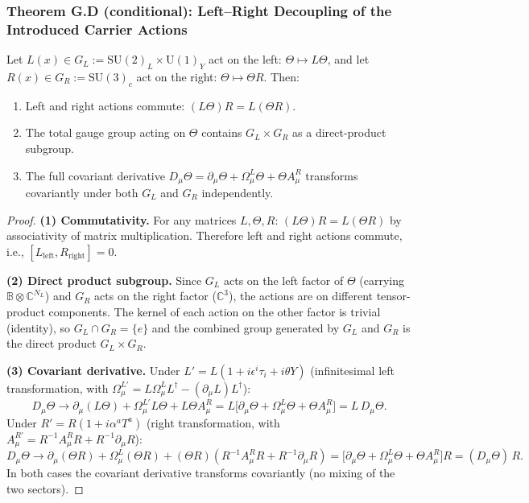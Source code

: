 \subsubsection*{Theorem G.D (conditional): Left--Right Decoupling of the Introduced Carrier Actions}

\begin{tcolorbox}[colback=blue!3!white,colframe=blue!40!black,title=Theorem G.D (conditional on the stated left/right actions)]
Let $L(x)\in G_L:=\mathrm{SU}(2)_L\times\mathrm{U}(1)_Y$ act on the left:
$\Theta\mapsto L\Theta$, and let $R(x)\in G_R:=\mathrm{SU}(3)_c$ act on the right:
$\Theta\mapsto\Theta R$.  Then:
\begin{enumerate}
  \item Left and right actions commute: $(L\Theta)R = L(\Theta R)$.
  \item The total gauge group acting on $\Theta$ contains $G_L\times G_R$ as a direct-product
        subgroup.
  \item The full covariant derivative
        $D_\mu\Theta = \partial_\mu\Theta + \Omega_\mu^L\Theta + \Theta A_\mu^R$
        transforms covariantly under both $G_L$ and $G_R$ independently.
\end{enumerate}
\end{tcolorbox}

\begin{proof}
\textbf{(1) Commutativity.}  For any matrices $L,\Theta,R$:
$(L\Theta)R = L(\Theta R)$ by associativity of matrix multiplication.
Therefore left and right actions commute, i.e., $[L_{\mathrm{left}}, R_{\mathrm{right}}]=0$.

\medskip
\textbf{(2) Direct product subgroup.}
Since $G_L$ acts on the left factor of $\Theta$ (carrying $\mathbb{B}\otimes\mathbb{C}^{N_L}$)
and $G_R$ acts on the right factor ($\mathbb{C}^3$), the actions are on different tensor-product
components.  The kernel of each action on the other factor is trivial (identity), so
$G_L\cap G_R=\{e\}$ and the combined group generated by $G_L$ and $G_R$ is the direct product
$G_L\times G_R$.

\medskip
\textbf{(3) Covariant derivative.}
Under $L'=L(1+i\epsilon^i\tau_i+i\theta Y)$ (infinitesimal left transformation, with
$\Omega_\mu^{L'} = L\Omega_\mu^L L^\dagger - (\partial_\mu L)L^\dagger$):
\[
D_\mu\Theta \to \partial_\mu(L\Theta) + \Omega_\mu^{L'} L\Theta + L\Theta A_\mu^R
= L\bigl[\partial_\mu\Theta+\Omega_\mu^L\Theta+\Theta A_\mu^R\bigr] = L\,D_\mu\Theta.
\]
Under $R'=R(1+i\alpha^a T^a)$ (right transformation, with $A_\mu^{R'} = R^{-1}A_\mu^R R + R^{-1}\partial_\mu R$):
\[
D_\mu\Theta \to \partial_\mu(\Theta R) + \Omega_\mu^L(\Theta R) + (\Theta R)(R^{-1}A_\mu^R R + R^{-1}\partial_\mu R)
= \bigl[\partial_\mu\Theta + \Omega_\mu^L\Theta + \Theta A_\mu^R\bigr]R = (D_\mu\Theta)\,R.
\]
In both cases the covariant derivative transforms covariantly (no mixing of the two sectors).
\end{proof}

